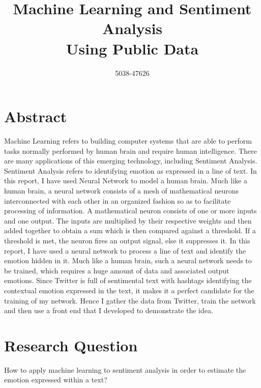 \documentclass[12pt]{article}
\author{5038-47626}
\title{Machine Learning and Sentiment Analysis\\Using Public Data}
\begin{document}
    \begin{titlepage}
        \maketitle
    \end{titlepage}
    \tableofcontents

        \section{Abstract}
        Machine Learning refers to building computer systems that are able to perform tasks normally performed by human brain and require human intelligence.  There are many applications of this emerging technology, including Sentiment Analysis. Sentiment Analysis refers to identifying emotion as expressed in a line of text. In this report, I have used Neural Network to model a human brain.  Much like a human brain, a neural network consists of a mesh of mathematical neurons interconnected with each other in an organized fashion so as to facilitate processing of information.  A mathematical neuron consists of one or more inputs and one output.  The inputs are multiplied by their respective weights and then added together to obtain a sum which is then compared against a threshold.  If a threshold is met, the neuron fires an output signal, else it suppresses it.  In this report, I have used a neural network to process a line of text and identify the emotion hidden in it.  Much like a human brain, such a neural network needs to be trained, which requires a huge amount of data and associated output emotions.  Since Twitter is full of sentimental text with hashtags identifying the contextual emotion expressed in the text, it makes it a perfect candidate for the training of my network.  Hence I gather the data from Twitter, train the network and then use a front end that I developed to demonstrate the idea.
        
    \section{Research Question}
    How to apply machine learning to sentiment analysis in order to estimate the emotion expressed within a text?
\end{document}

